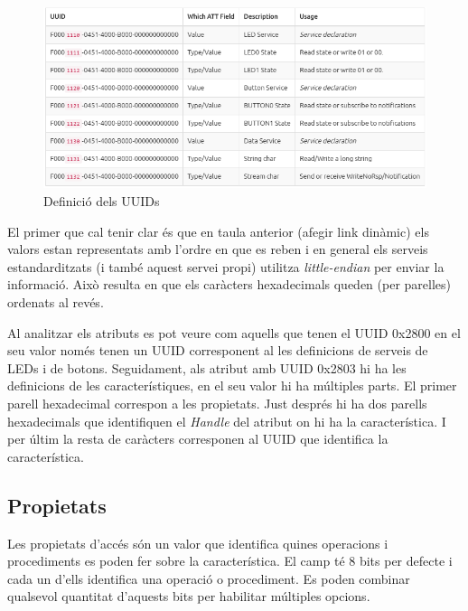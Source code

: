 \begin{figure}[h!]
	\begin{center}
		\includegraphics[width=\textwidth]{./images/Project_0_UUID.png}
		\caption{Definició dels UUIDs}
	\end{center}
\end{figure}

El primer que cal tenir clar és que en taula anterior (afegir link dinàmic) els valors estan representats amb l'ordre en que es reben i en general els serveis estandarditzats (i també aquest servei propi) utilitza \textit{little-endian} per enviar la informació.
Això resulta en que els caràcters hexadecimals queden (per parelles) ordenats al revés.

Al analitzar els atributs es pot veure com aquells que tenen el UUID 0x2800 en el seu valor només tenen un UUID corresponent al les definicions de serveis de LEDs i de botons.
Seguidament, als atribut amb UUID 0x2803 hi ha les definicions de les característiques, en el seu valor hi ha múltiples parts.
El primer parell hexadecimal correspon a les propietats. Just després hi ha dos parells hexadecimals que identifiquen el \textit{Handle} del atribut on hi ha la característica.
I per últim la resta de caràcters corresponen al UUID que identifica la característica.

\subsection{Propietats}
Les propietats d'accés són un valor que identifica quines operacions i procediments es poden fer sobre la característica.
El camp té 8 bits per defecte i cada un d'ells identifica una operació o procediment.
Es poden combinar qualsevol quantitat d'aquests bits per habilitar múltiples opcions.

